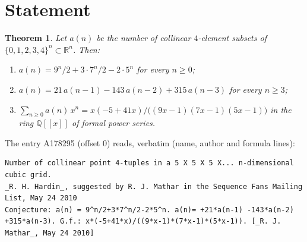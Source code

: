 \documentclass[11pt]{amsart}
\theoremstyle{plain}
\newtheorem{theorem}{Theorem}
\theoremstyle{definition}
\newcommand{\Q}{\mathbb{Q}}
\newcommand{\R}{\mathbb{R}}
\begin{document}
\section{Statement}\label{sec:statement}

\begin{theorem}\label{thm:main}
Let $a(n)$ be the number of collinear $4$-element subsets of $\{0,1,2,3,4\}^n\subset\R^n$. Then:
\begin{enumerate}
\item $a(n)=9^n/2+3\cdot7^n/2-2\cdot5^n$ for every $n\ge0$;
\item $a(n)=21\,a(n-1)-143\,a(n-2)+315\,a(n-3)$ for every $n\ge3$;
\item $\sum_{n\ge0}a(n)\,x^n=x(-5+41x)/\bigl((9x-1)(7x-1)(5x-1)\bigr)$ in the ring $\Q[[x]]$ of formal power series.
\end{enumerate}
\end{theorem}

The entry A178295 \cite{A178295} (offset $0$) reads, verbatim (name, author and formula lines):
\begin{lstlisting}[language={},frame=none,basicstyle=\ttfamily\footnotesize,literate={}]
Number of collinear point 4-tuples in a 5 X 5 X 5 X... n-dimensional cubic grid.
_R. H. Hardin_, suggested by R. J. Mathar in the Sequence Fans Mailing List, May 24 2010
Conjecture: a(n) = 9^n/2+3*7^n/2-2*5^n. a(n)= +21*a(n-1) -143*a(n-2) +315*a(n-3). G.f.: x*(-5+41*x)/((9*x-1)*(7*x-1)*(5*x-1)). [_R. J. Mathar_, May 24 2010]
\end{lstlisting}
\end{document}
